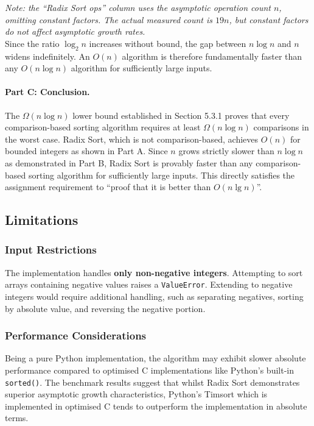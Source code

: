 \documentclass[12pt]{article}
\begin{document}
\noindent \emph{Note: the ``Radix Sort ops'' column uses the asymptotic operation count $n$, omitting constant factors. The actual measured count is $19n$, but constant factors do not affect asymptotic growth rates.}\\

Since the ratio $\log_2 n$ increases without bound, the gap between $n \log n$ and $n$ widens indefinitely. An $O(n)$ algorithm is therefore fundamentally faster than any $O(n \log n)$ algorithm for sufficiently large inputs.

\paragraph{Part C: Conclusion.}
The $\Omega(n \log n)$ lower bound established in Section 5.3.1 proves that every comparison-based sorting algorithm requires at least $\Omega(n \log n)$ comparisons in the worst case. Radix Sort, which is not comparison-based, achieves $O(n)$ for bounded integers as shown in Part A. Since $n$ grows strictly slower than $n \log n$ as demonstrated in Part B, Radix Sort is provably faster than any comparison-based sorting algorithm for sufficiently large inputs. This directly satisfies the assignment requirement to ``proof that it is better than $O(n \lg n)$''.

\subsection{Limitations}

\subsubsection{Input Restrictions}
The implementation handles \textbf{only non-negative integers}. Attempting to sort arrays containing negative values raises a \texttt{ValueError}. Extending to negative integers would require additional handling, such as separating negatives, sorting by absolute value, and reversing the negative portion.

\subsubsection{Performance Considerations}
Being a pure Python implementation, the algorithm may exhibit slower absolute performance compared to optimised C implementations like Python's built-in \texttt{sorted()}. The benchmark results suggest that whilst Radix Sort demonstrates superior asymptotic growth characteristics, Python's Timsort which is implemented in optimised C tends to outperform the implementation in absolute terms.
\end{document}
